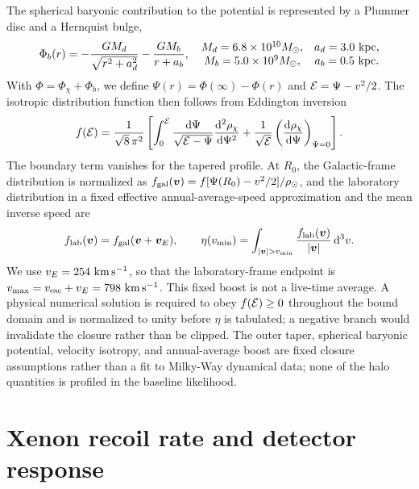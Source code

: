 \documentclass[%
  aps,
  prl,
  reprint,
  superscriptaddress,
  amsmath,
  amssymb,
  longbibliography
]{revtex4-2}
\begin{document}
The spherical baryonic contribution to the potential is represented by a
Plummer disc and a Hernquist bulge,
\begin{equation}
 \Phi_b(r)=-\frac{GM_d}{\sqrt{r^2+a_d^2}}
            -\frac{GM_b}{r+a_b},
 \quad
 \begin{matrix}
 M_d=6.8\times10^{10}M_\odot,& a_d=3.0~{\rm kpc},\\
 M_b=5.0\times10^9M_\odot,& a_b=0.5~{\rm kpc}.
 \end{matrix}
 \label{eq:baryonic-potential-supp}
\end{equation}
With \(\Phi=\Phi_\chi+\Phi_b\), we define
\(\Psi(r)=\Phi(\infty)-\Phi(r)\) and
\({\cal E}=\Psi-v^2/2\).  The isotropic distribution function then follows
from Eddington inversion %
\begin{equation}
 f({\cal E})=\frac{1}{\sqrt{8}\,\pi^2}
 \left[
 \int_0^{\cal E}\frac{\mathrm{d}\Psi}
 {\sqrt{{\cal E}-\Psi}}\frac{\mathrm{d}^2\rho_\chi}{\mathrm{d}\Psi^2}
 +\frac{1}{\sqrt{\cal E}}
 \left(\frac{\mathrm{d}\rho_\chi}{\mathrm{d}\Psi}\right)_{\Psi=0}
 \right].
 \label{eq:eddington-inversion-supp}
\end{equation}
The boundary term vanishes for the tapered profile.  At \(R_0\), the
Galactic-frame distribution is normalized as
\(f_{\rm gal}(\bm v)=f[\Psi(R_0)-v^2/2]/\rho_\odot\), and the laboratory
distribution in a fixed effective annual-average-speed approximation and the
mean inverse speed are
\begin{equation}
 f_{\rm lab}(\bm v)=f_{\rm gal}(\bm v+\bm v_E),\qquad
 \eta(v_{\min})=\int_{|\bm v|>v_{\min}}
 \frac{f_{\rm lab}(\bm v)}{|\bm v|}\,\mathrm{d}^3v .
 \label{eq:mean-inverse-speed-supp}
\end{equation}
We use \(v_E=254~{\rm km\,s^{-1}}\), so that the laboratory-frame endpoint
is \(v_{\max}=v_{\rm esc}+v_E=798~{\rm km\,s^{-1}}\).  This fixed boost is
not a live-time average.  A physical numerical solution is required to obey
\(f({\cal E})\geq0\) throughout the bound domain and is normalized to unity
before \(\eta\) is tabulated; a negative branch would invalidate the closure
rather than be clipped.  The outer taper, spherical baryonic
potential, velocity isotropy, and annual-average boost are fixed closure
assumptions rather than a fit to Milky-Way dynamical data; none of the halo
quantities is profiled in the baseline likelihood.

\section{Xenon recoil rate and detector response}
\label{subsec:xenon-rate-supp}
\end{document}
